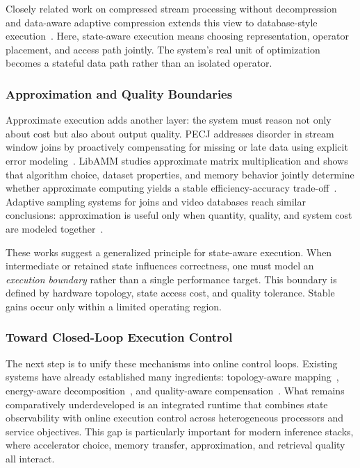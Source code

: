 \documentclass[acmsmall,screen,review]{acmart}
\begin{document}
Closely related work on compressed stream processing without decompression and data-aware adaptive compression extends this view to database-style execution~\cite{zhang2023compressstreamdb,yu2025adaptivecompression}. Here, state-aware execution means choosing representation, operator placement, and access path jointly. The system's real unit of optimization becomes a stateful data path rather than an isolated operator.

\subsubsection{Approximation and Quality Boundaries}

Approximate execution adds another layer: the system must reason not only about cost but also about output quality. PECJ addresses disorder in stream window joins by proactively compensating for missing or late data using explicit error modeling~\cite{zeng2024pecj}. LibAMM studies approximate matrix multiplication and shows that algorithm choice, dataset properties, and memory behavior jointly determine whether approximate computing yields a stable efficiency-accuracy trade-off~\cite{zeng2024libamm}. Adaptive sampling systems for joins and video databases reach similar conclusions: approximation is useful only when quantity, quality, and system cost are modeled together~\cite{tang2025freesam,xu2024leap}.

These works suggest a generalized principle for state-aware execution. When intermediate or retained state influences correctness, one must model an \emph{execution boundary} rather than a single performance target. This boundary is defined by hardware topology, state access cost, and quality tolerance. Stable gains occur only within a limited operating region.

\subsubsection{Toward Closed-Loop Execution Control}

The next step is to unify these mechanisms into online control loops. Existing systems have already established many ingredients: topology-aware mapping~\cite{zhang2020finestream}, energy-aware decomposition~\cite{zeng2024cstream}, and quality-aware compensation~\cite{zeng2024pecj}. What remains comparatively underdeveloped is an integrated runtime that combines state observability with online execution control across heterogeneous processors and service objectives. This gap is particularly important for modern inference stacks, where accelerator choice, memory transfer, approximation, and retrieval quality all interact.
\end{document}
